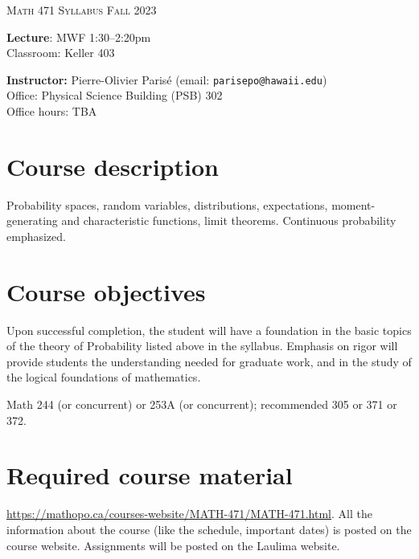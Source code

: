 \documentclass[12pt]{amsart}
\newcommand{\spacer}{\vspace{.2cm}}
\newcommand{\svs}{\vspace{.1cm}}
\begin{document}
\thispagestyle{empty}

\begin{center}
\textsc{Math 471} \hfill {\Large\textsc{Syllabus}} \hfill \textsc{Fall 2023}
\end{center}

\noindent\hrulefill

\noindent \textbf{Lecture}: MWF 1:30--2:20pm \\
Classroom: Keller 403

\spacer

\noindent\textbf{Instructor:} Pierre-Olivier Paris{\'e} (email: \texttt{parisepo@hawaii.edu})\\
Office: Physical Science Building (PSB) 302\\
Office hours: TBA

\noindent\hrulefill

\section*{Course description}
Probability spaces, random variables, distributions, expectations, moment-generating and characteristic functions, limit theorems. Continuous probability emphasized.\svs

\section*{Course objectives}
Upon successful completion, the student will have a foundation in the basic topics of the theory of Probability listed above in the syllabus. Emphasis on rigor will provide students the understanding needed for graduate work, and in the study of the logical foundations of mathematics.

Math 244 (or concurrent) or 253A (or concurrent); recommended 305 or 371 or 372.

\section*{Required course material}
 \url{https://mathopo.ca/courses-website/MATH-471/MATH-471.html}. All the information about the course (like the schedule, important dates) is posted on the course website. Assignments will be posted on the Laulima website.
\end{document}
